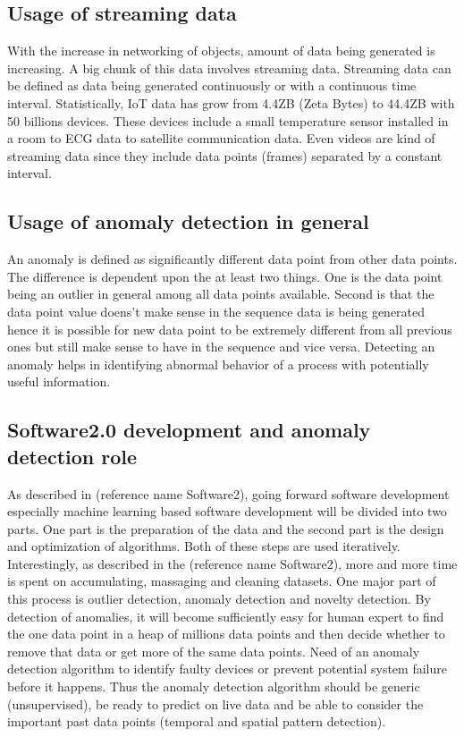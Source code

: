 \documentclass[12pt]{article}
\begin{document}
\subsection{Usage of streaming data}
With the increase in networking of objects, amount of data being generated is increasing. A big chunk of this data involves streaming data. Streaming data can be defined as data being generated continuously or with a continuous time interval. Statistically, IoT data has grow from 4.4ZB (Zeta Bytes) to 44.4ZB with 50 billions devices. These devices include a small temperature sensor installed in a room to ECG data to satellite communication data. Even videos are kind of streaming data since they include data points (frames) separated by a constant interval. 
\subsection{Usage of anomaly detection in general}
An anomaly is defined as significantly different data point from other data points. The difference is dependent upon the at least two things. One is the data point being an outlier in general among all data points available. Second is that the data point value doens't make sense in the sequence data is being generated hence it is possible for new data point to be extremely different from all previous ones but still make sense to have in the sequence and vice versa. Detecting an anomaly helps in identifying abnormal behavior of a process with potentially useful information. 
\subsection{Software2.0 development and anomaly detection role}
As described in (reference name Software2), going forward software development especially machine learning based software development will be divided into two parts. One part is the preparation of the data and the second part is the design and optimization of algorithms. Both of these steps are used iteratively. Interestingly, as described in the (reference name Software2), more and more time is spent on accumulating, massaging and cleaning datasets. One major part of this process is outlier detection, anomaly detection and novelty detection. By detection of anomalies, it will become sufficiently easy for human expert to find the one data point in a heap of millions data points and then decide whether to remove that data or get more of the same data points.
Need of an anomaly detection algorithm to identify faulty devices or prevent potential system failure before it happens. Thus the anomaly detection algorithm should be generic (unsupervised), be ready to predict on live data and be able to consider the important past data points (temporal and spatial pattern detection).
\end{document}
